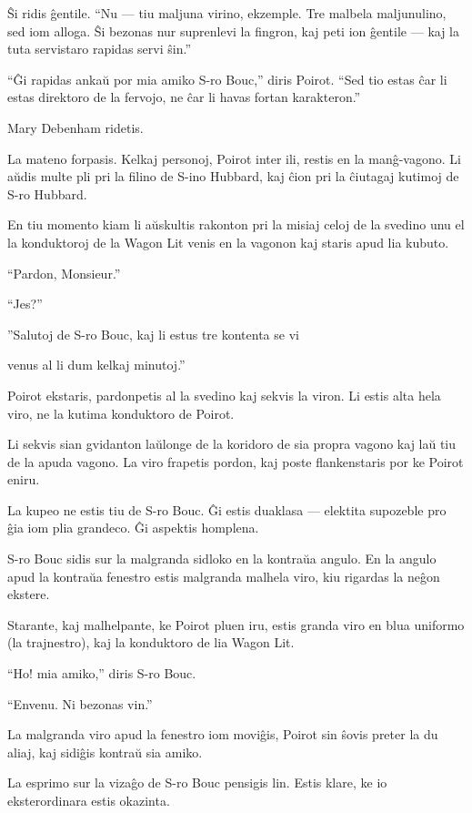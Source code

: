 Ŝi ridis ĝentile. ``Nu --- tiu maljuna virino, ekzemple. Tre malbela maljunulino, sed iom alloga. Ŝi bezonas nur suprenlevi la fingron, kaj peti ion ĝentile --- kaj la tuta servistaro rapidas servi ŝin.''

``Ĝi rapidas ankaŭ por mia amiko S-ro Bouc,'' diris Poirot. ``Sed tio estas ĉar li estas direktoro de la fervojo, ne ĉar li havas fortan karakteron.''

Mary Debenham ridetis.

La mateno forpasis. Kelkaj personoj, Poirot inter ili, restis en la manĝ-vagono. Li aŭdis multe pli pri la filino de S-ino Hubbard, kaj ĉion pri la ĉiutagaj kutimoj de S-ro Hubbard.

En tiu momento kiam li aŭskultis rakonton pri la misiaj celoj de la svedino unu el la konduktoroj de la Wagon Lit venis en la vagonon kaj staris apud lia kubuto.

``Pardon, Monsieur.''

``Jes?''

''Salutoj de S-ro Bouc, kaj li estus tre kontenta se vi

venus al li dum kelkaj minutoj.''

Poirot ekstaris, pardonpetis al la svedino kaj sekvis la viron. Li estis alta hela viro, ne la kutima konduktoro de Poirot.

Li sekvis sian gvidanton laŭlonge de la koridoro de sia propra vagono kaj laŭ tiu de la apuda vagono. La viro frapetis pordon, kaj poste flankenstaris por ke Poirot eniru.

La kupeo ne estis tiu de S-ro Bouc. Ĝi estis duaklasa --- elektita supozeble pro ĝia iom plia grandeco. Ĝi aspektis homplena.

S-ro Bouc sidis sur la malgranda sidloko en la kontraŭa angulo. En la angulo apud la kontraŭa fenestro estis malgranda malhela viro, kiu rigardas la neĝon ekstere.

Starante, kaj malhelpante, ke Poirot pluen iru, estis granda viro en blua uniformo (la trajnestro), kaj la konduktoro de lia Wagon Lit.

``Ho! mia amiko,'' diris S-ro Bouc.

``Envenu. Ni bezonas vin.''

La malgranda viro apud la fenestro iom moviĝis, Poirot sin ŝovis preter la du aliaj, kaj sidiĝis kontraŭ sia amiko.

La esprimo sur la vizaĝo de S-ro Bouc pensigis lin. Estis klare, ke io eksterordinara estis okazinta.


